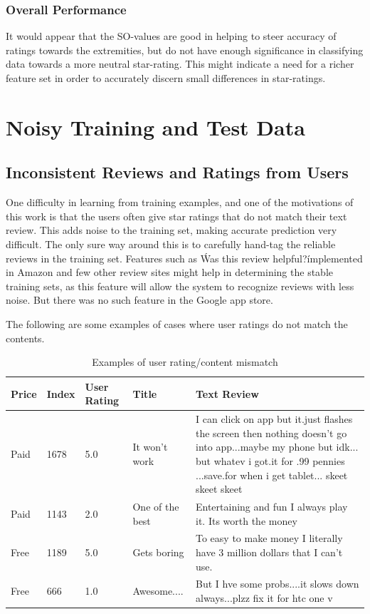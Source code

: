 \documentclass[11pt]{report} %
\begin{document}
\subsubsection{Overall Performance}
It would appear that the SO-values are good in helping to steer accuracy of ratings towards the extremities, but do not have enough significance in classifying data towards a more neutral star-rating. This might indicate a need for a richer feature set in order to accurately discern small differences in star-ratings. 

	\section{Noisy Training and Test Data}
\subsection{Inconsistent Reviews and Ratings from Users}

One difficulty in learning from training examples, and one of the motivations of this work is that the users often give star ratings that do not match their text review. This adds noise to the training set, making accurate prediction very difficult. The only sure way around this is to carefully hand-tag the reliable reviews in the training set. Features such as \'Was this review helpful?\' implemented in Amazon and few other review sites might help in determining the stable training sets, as this feature will allow the system to recognize reviews with less noise. But there was no such feature in the Google app store.

The following are some examples of cases where user ratings do not match the contents.

\begin{table}[h]
	\centering
    \begin{tabularx}{\textwidth}{ l | l | l |  l | X}
    \hline\hline
		Price  & Index & User Rating & Title & Text Review\\ 
    \hline
		Paid & 1678 & 5.0 & It won't work & I can click on app but it.just flashes the screen then nothing doesn't go into app...maybe my phone but idk... but whatev i got.it for .99 pennies ...save.for when i get tablet... skeet skeet skeet \\
		Paid & 1143 & 2.0 & One of the best & Entertaining and fun I always play it. Its worth the money \\
		Free & 1189 & 5.0 & Gets boring & To easy to make money I literally have 3 million dollars that I can't use. \\
		Free & 666 & 1.0 & Awesome.... & But I hve some probs....it slows down always...plzz fix it for htc one v \\
    \hline
    \end{tabularx}
\caption{Examples of user rating/content mismatch}
\label{fig:postags}
\end{table}
\end{document}
